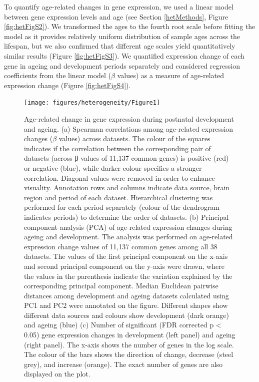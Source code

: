 \documentclass[12pt,twoside]{unicam}
\begin{document}
To quantify age-related changes in gene expression, we used a linear model between gene expression levels and age (see Section \ref{hetMethods}, Figure \ref{fig:hetFigS2}). We transformed the ages to the fourth root scale before fitting the model as it provides relatively uniform distribution of sample ages across the lifespan, but we also confirmed that different age scales yield quantitatively similar results (Figure \ref{fig:hetFigS3}). We quantified expression change of each gene in ageing and development periods separately and considered regression coefficients from the linear model (\(\beta\) values) as a measure of age-related expression change (Figure \ref{fig:hetFigS4}).

\begin{figure}

{\centering \texttt{[image: figures/heterogeneity/Figure1]} 

}

\caption[Age-related change in gene expression during postnatal development and ageing.]{Age-related change in gene expression during postnatal development and ageing. (a) Spearman correlations among age-related expression changes ($\beta$  values) across datasets. The colour of the squares indicates if the correlation between the corresponding pair of datasets (across β values of 11,137 common genes) is positive (red) or negative (blue), while darker colour specifies a stronger correlation. Diagonal values were removed in order to enhance visuality. Annotation rows and columns indicate data source, brain region and period of each dataset. Hierarchical clustering was performed for each period separately (colour of the dendrogram indicates periods) to determine the order of datasets. (b) Principal component analysis (PCA) of age-related expression changes during ageing and development. The analysis was performed on age-related expression change values of 11,137 common genes among all 38 datasets. The values of the first principal component on the x-axis and second principal component on the y-axis were drawn, where the values in the parenthesis indicate the variation explained by the corresponding principal component. Median Euclidean pairwise distances among development and ageing datasets calculated using PC1 and PC2 were annotated on the figure. Different shapes show different data sources and colours show development (dark orange) and ageing (blue) (c) Number of significant (FDR corrected p < 0.05) gene expression changes in development (left panel) and ageing (right panel). The x-axis shows the number of genes in the log scale. The colour of the bars shows the direction of change, decrease (steel grey), and increase (orange). The exact number of genes are also displayed on the plot.}\label{fig:hetFig1}
\end{figure}
\end{document}
